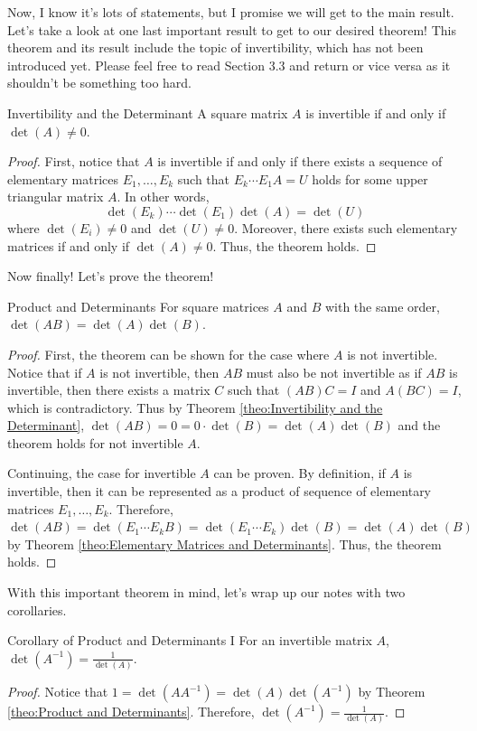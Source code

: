 \documentclass[../main.tex]{subfiles}
\begin{document}
Now, I know it's lots of statements, but I promise we will get to
the main result. Let's take a look at one last important result to
get to our desired theorem! This theorem and its result include
the topic of invertibility, which has not been introduced yet. Please
feel free to read Section 3.3 and return or vice versa as it shouldn't
be something too hard.

\begin{theorem}{Invertibility and the Determinant}
A square matrix $A$ is invertible if and only if $\det(A) \neq 0$.
\end{theorem}
\begin{proof}
First, notice that $A$ is invertible if and only if there exists a
sequence of elementary matrices $E_1, \ldots, E_k$ such that
$E_k \cdots E_1 A = U$ holds for some upper triangular matrix $A$.
In other words,
\[
\det(E_k) \cdots \det(E_1) \det(A) = \det(U)
\]
where $\det(E_i) \neq 0$ and $\det(U) \neq 0$. Moreover, there exists
such elementary matrices if and only if $\det(A) \neq 0$. Thus, the
theorem holds.
\end{proof}

Now finally! Let's prove the theorem!

\begin{theorem}{Product and Determinants}
For square matrices $A$ and $B$ with the same order, $\det(AB) =
\det(A) \det(B)$.
\end{theorem}
\begin{proof}
First, the theorem can be shown for the case where $A$ is not
invertible. Notice that if $A$ is not invertible, then $AB$
must also be not invertible as if $AB$ is invertible, then
there exists a matrix $C$ such that $(AB)C = I$ and $A(BC) = I$,
which is contradictory. Thus by Theorem \ref{theo:Invertibility and
the Determinant}, $\det(AB) = 0 = 0 \cdot \det(B) = \det(A) \det(B)$
and the theorem holds for not invertible $A$.

Continuing, the case for invertible $A$ can be proven. By definition,
if $A$ is invertible, then it can be represented as a product of
sequence of elementary matrices $E_1, \ldots, E_k$. Therefore,
$\det(AB) = \det(E_1 \cdots E_k B) = \det(E_1 \cdots E_k) \det(B) =
\det(A) \det(B)$ by Theorem \ref{theo:Elementary Matrices and
Determinants}. Thus, the theorem holds.
\end{proof}

With this important theorem in mind, let's wrap up our notes with
two corollaries.

\begin{corollary}{Corollary of Product and Determinants I}
For an invertible matrix $A$, $\det(A^{-1}) = \frac{1}{\det(A)}$.
\end{corollary}
\begin{proof}
Notice that $1 = \det(AA^{-1}) = \det(A) \det(A^{-1})$ by Theorem
\ref{theo:Product and Determinants}. Therefore, $\det(A^{-1}) =
\frac{1}{\det(A)}$.
\end{proof}
\end{document}
